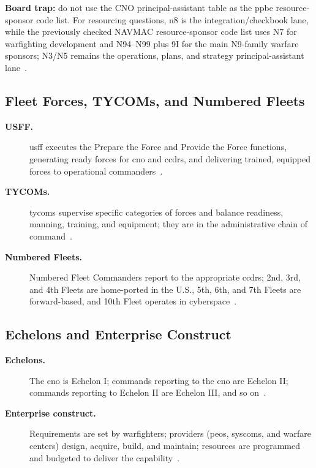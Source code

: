 \documentclass[../main.tex]{subfiles}
\begin{document}
\noindent\textbf{Board trap:} do not use the CNO principal-assistant table as the \ac{ppbe} resource-sponsor code list. For resourcing questions, \ac{n8} is the integration/checkbook lane, while the previously checked NAVMAC resource-sponsor code list uses N7 for warfighting development and N94--N99 plus 9I for the main N9-family warfare sponsors; N3/N5 remains the operations, plans, and strategy principal-assistant lane~\autocite{NAVMAC-AMMG-2025}.

\subsection{Fleet Forces, TYCOMs, and Numbered Fleets}
\begin{description}
  \item[\textbf{USFF.}] \ac{usff} executes the Prepare the Force and Provide the Force functions, generating ready forces for \ac{cno} and \acp{ccdr}, and delivering trained, equipped forces to operational commanders~\autocite{USFF-Mission,edo-2-1-1-command-structures-2025}.
  \item[\textbf{TYCOMs.}] \acp{tycom} supervise specific categories of forces and balance readiness, manning, training, and equipment; they are in the administrative chain of command~\autocite{edo-2-1-1-command-structures-2025}.
  \item[\textbf{Numbered Fleets.}] Numbered Fleet Commanders report to the appropriate \acp{ccdr}; 2nd, 3rd, and 4th Fleets are home-ported in the U.S., 5th, 6th, and 7th Fleets are forward-based, and 10th Fleet operates in cyberspace~\autocite{edo-2-1-1-command-structures-2025}.
\end{description}

\subsection{Echelons and Enterprise Construct}
\begin{description}
  \item[\textbf{Echelons.}] The \ac{cno} is Echelon I; commands reporting to the \ac{cno} are Echelon II; commands reporting to Echelon II are Echelon III, and so on~\autocite{edo-2-1-1-command-structures-2025}.
  \item[\textbf{Enterprise construct.}] Requirements are set by warfighters; providers (\acp{peo}, \acp{syscom}, and warfare centers) design, acquire, build, and maintain; resources are programmed and budgeted to deliver the capability~\autocite{edo-2-1-1-command-structures-2025}.
\end{description}
\end{document}
